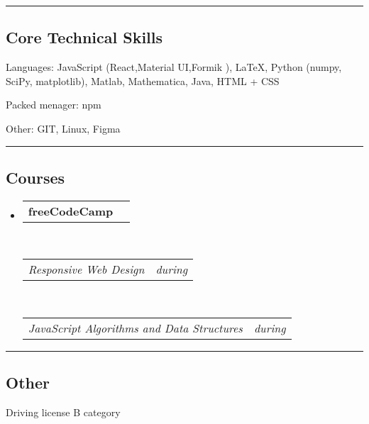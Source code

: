 \documentclass[10pt,letterpaper]{article}
\makeatletter
\newenvironment{indentsection}[1]%
{\begin{list}{}%
	{\setlength{\leftmargin}{#1}}%
	\item[]%
}
{\end{list}}
\newcommand{\headerrow}[2]
{\begin{tabular*}{\linewidth}{l@{\extracolsep{\fill}}r}
	#1 &
	#2 \\
\end{tabular*}}
\makeatother
\begin{document}
\hrule
\vspace{-0.4em}
\subsection*{Core Technical Skills}

\begin{indentsection}{\parindent}
\begin{description*}
	\item[Languages:]
	JavaScript (React,Material UI,Formik ), \LaTeX, Python (numpy, SciPy, matplotlib), Matlab, \newline Mathematica, Java, HTML + CSS
	\item[Packed menager:] npm
	\item[Other:] GIT, Linux, Figma
  
\end{description*}
\end{indentsection}



\hrule
\vspace{-0.4em}
\subsection*{Courses}

\begin{itemize}
	\parskip=0.1em

	\item 
	\headerrow
		{\textbf{freeCodeCamp}}
		{\textbf{}}
	\\
	\headerrow
		{\emph{Responsive Web Design}}
		{\emph{during}}
		\\
	\headerrow	
		{\emph{JavaScript Algorithms and Data Structures}}
		{\emph{during}}
		
\end{itemize}


\hrule
\vspace{-0.4em}
\subsection*{Other}
\begin{indentsection}{\parindent}
  \begin{description*}
    \item Driving license B category 
  \end{description*}
  \end{indentsection}
\end{document}
